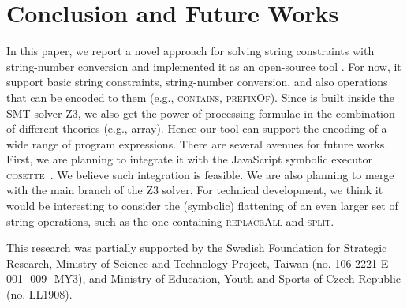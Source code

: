 \documentclass[sigplan,screen]{acmart}
\begin{document}
\section{Conclusion and Future Works}
\label{section:conclusion}
In this paper, we report a novel approach for solving string constraints with string-number conversion and implemented it as an open-source tool {\tool}. For now, it support basic string constraints, string-number conversion, and also operations that can be encoded to them (e.g., \textsc{contains}, \textsc{prefixOf}). Since {\tool} is built inside the SMT solver Z3, we also get the power of processing formulae in the combination of different theories (e.g., array). Hence our tool can support the encoding of a wide range of program expressions. There are several avenues for future works. First, we are planning to integrate it with the JavaScript symbolic executor \textsc{cosette}~\cite{santos2018symbolic}. We  believe such integration  is feasible. 
We are also planning to merge  {\tool}  with the main branch of the Z3 solver. For technical development, we think it would be interesting to consider the (symbolic) flattening of an even larger set of string operations, such as the one containing  \textsc{replaceAll} and \textsc{split}. 




\begin{acks}
This research was  partially supported by the  Swedish Foundation for Strategic Research, Ministry of Science and Technology Project, Taiwan (no. 106-2221-E-001 -009 -MY3), and Ministry of Education, Youth and Sports of Czech Republic (no. LL1908).
\end{acks}

 \balance


\end{document}

